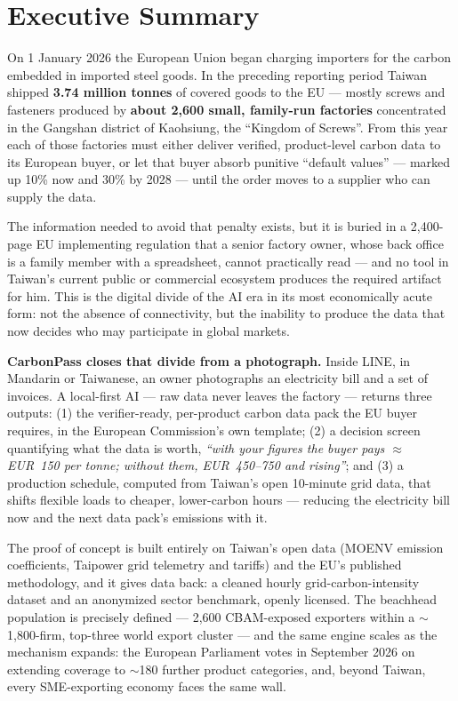 \section*{Executive Summary}

On 1 January 2026 the European Union began charging importers for the carbon
embedded in imported steel goods. In the preceding reporting period Taiwan
shipped \textbf{3.74 million tonnes} of covered goods to the EU --- mostly
screws and fasteners produced by \textbf{about 2,600 small, family-run
factories} concentrated in the Gangshan district of Kaohsiung, the ``Kingdom of
Screws''\cite{tpt-cbam}. From this year each of those factories must either
deliver verified, product-level carbon data to its European buyer, or let that
buyer absorb punitive ``default values'' --- marked up 10\% now and 30\% by
2028\cite{omm} --- until the order moves to a supplier who can supply the data.

The information needed to avoid that penalty exists, but it is buried in a
2,400-page EU implementing regulation\cite{omm} that a senior factory owner,
whose back office is a family member with a spreadsheet, cannot practically
read --- and no tool in Taiwan's current public or commercial ecosystem
produces the required artifact for him\cite{caas,idb,tpt-cbam}. This is the
digital divide of the AI era in its most economically acute form: not the
absence of connectivity, but the inability to produce the data that now decides
who may participate in global markets.

\textbf{CarbonPass closes that divide from a photograph.} Inside LINE, in
Mandarin or Taiwanese, an owner photographs an electricity bill and a set of
invoices. A local-first AI --- raw data never leaves the factory --- returns
three outputs: (1) the verifier-ready, per-product carbon data pack the EU
buyer requires, in the European Commission's own template; (2) a decision
screen quantifying what the data is worth, \emph{``with your figures the buyer
pays $\approx$EUR~150 per tonne; without them, EUR~450--750 and
rising''}\cite{ecprice,specialinsert}; and (3) a production schedule, computed
from Taiwan's open 10-minute grid data\cite{taipowerdata}, that shifts flexible
loads to cheaper, lower-carbon hours --- reducing the electricity bill now and
the next data pack's emissions with it.

The proof of concept is built entirely on Taiwan's open data (MOENV emission
coefficients, Taipower grid telemetry and tariffs) and the EU's published
methodology, and it gives data back: a cleaned hourly grid-carbon-intensity
dataset and an anonymized sector benchmark, openly licensed. The beachhead
population is precisely defined --- 2,600 CBAM-exposed exporters within a
$\sim$1,800-firm, top-three world export cluster --- and the same engine scales
as the mechanism expands: the European Parliament votes in September 2026 on
extending coverage to $\sim$180 further product categories\cite{akin}, and,
beyond Taiwan, every SME-exporting economy faces the same wall.

